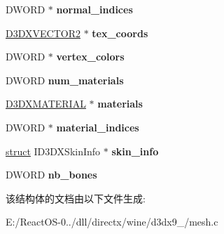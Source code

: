 \begin{DoxyCompactItemize}
\item 
\mbox{\label{structmesh__data_a29d1731ea22eee6b9c1e2c71dab2edda}} 
D\+W\+O\+RD $\ast$ {\bfseries normal\+\_\+indices}
\item 
\mbox{\label{structmesh__data_a6931a48c5ecb8c149c055a1f92081e07}} 
\hyperlink{struct_d3_d_x_v_e_c_t_o_r2}{D3\+D\+X\+V\+E\+C\+T\+O\+R2} $\ast$ {\bfseries tex\+\_\+coords}
\item 
\mbox{\label{structmesh__data_a0e6d99b9288d3d5affb5127461bd9099}} 
D\+W\+O\+RD $\ast$ {\bfseries vertex\+\_\+colors}
\item 
\mbox{\label{structmesh__data_a95331a2bd63b41cf92c3467e3bad5358}} 
D\+W\+O\+RD {\bfseries num\+\_\+materials}
\item 
\mbox{\label{structmesh__data_a938a6c1ea923a38d7e9ed26270d9029a}} 
\hyperlink{struct___d3_d_x_m_a_t_e_r_i_a_l}{D3\+D\+X\+M\+A\+T\+E\+R\+I\+AL} $\ast$ {\bfseries materials}
\item 
\mbox{\label{structmesh__data_a5ee9cf5f4b7fa54b19c2c7c57c32edf0}} 
D\+W\+O\+RD $\ast$ {\bfseries material\+\_\+indices}
\item 
\mbox{\label{structmesh__data_a46ba377cc7c1b06c4e762bbeb65343f4}} 
\hyperlink{interfacestruct}{struct} I\+D3\+D\+X\+Skin\+Info $\ast$ {\bfseries skin\+\_\+info}
\item 
\mbox{\label{structmesh__data_ac542de38f5e917f2170407bc7d55f40b}} 
D\+W\+O\+RD {\bfseries nb\+\_\+bones}
\end{DoxyCompactItemize}


该结构体的文档由以下文件生成\+:\begin{DoxyCompactItemize}
\item 
E\+:/\+React\+O\+S-\/0../dll/directx/wine/d3dx9\+\_/mesh.\+c\end{DoxyCompactItemize}
